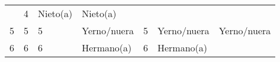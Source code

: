 \documentclass[
]{book}
\begin{document}
\begin{longtable}[]{@{}lllllll@{}}
\begin{minipage}[t]{0.16\columnwidth}
\end{minipage} & \begin{minipage}[t]{0.09\columnwidth}\raggedright
4\strut
\end{minipage} & \begin{minipage}[t]{0.16\columnwidth}\raggedright
Nieto(a)\strut
\end{minipage} & \begin{minipage}[t]{0.16\columnwidth}\raggedright
Nieto(a)\strut
\end{minipage}\tabularnewline
\begin{minipage}[t]{0.10\columnwidth}\raggedright
5\strut
\end{minipage} & \begin{minipage}[t]{0.07\columnwidth}\raggedright
5\strut
\end{minipage} & \begin{minipage}[t]{0.07\columnwidth}\raggedright
5\strut
\end{minipage} & \begin{minipage}[t]{0.16\columnwidth}\raggedright
Yerno/nuera\strut
\end{minipage} & \begin{minipage}[t]{0.09\columnwidth}\raggedright
5\strut
\end{minipage} & \begin{minipage}[t]{0.16\columnwidth}\raggedright
Yerno/nuera\strut
\end{minipage} & \begin{minipage}[t]{0.16\columnwidth}\raggedright
Yerno/nuera\strut
\end{minipage}\tabularnewline
\begin{minipage}[t]{0.10\columnwidth}\raggedright
6\strut
\end{minipage} & \begin{minipage}[t]{0.07\columnwidth}\raggedright
6\strut
\end{minipage} & \begin{minipage}[t]{0.07\columnwidth}\raggedright
6\strut
\end{minipage} & \begin{minipage}[t]{0.16\columnwidth}\raggedright
Hermano(a)\strut
\end{minipage} & \begin{minipage}[t]{0.09\columnwidth}\raggedright
6\strut
\end{minipage} & \begin{minipage}[t]{0.16\columnwidth}\raggedright
Hermano(a)\strut
\end{minipage} & \begin{minipage}[t]{0.16\columnwidth}\raggedright

\end{minipage}
\end{longtable}
\end{document}
